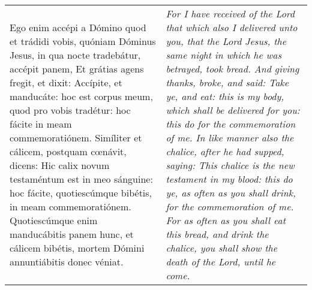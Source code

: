 \begin{tabular}{p{8cm} | p{8cm}}
Ego enim accépi a Dómino quod et trádidi vobis, quóniam Dóminus Jesus, in qua nocte tradebátur, accépit panem,
Et grátias agens fregit, et dixit: Accípite, et manducáte: hoc est corpus meum, quod pro vobis tradétur: hoc fácite in meam commemoratiónem.
Simíliter et cálicem, postquam c\oe návit, dicens: Hic calix novum testaméntum est in meo sánguine: hoc fácite, quotiescúmque bibétis, in meam commemoratiónem.
Quotiescúmque enim manducábitis panem hunc, et cálicem bibétis, mortem Dómini annuntiábitis donec véniat.
& \textit{For I have received of the Lord that which also I delivered unto you, that the Lord Jesus, the same night in which he was betrayed, took bread.
And giving thanks, broke, and said: Take ye, and eat: this is my body, which shall be delivered for you: this do for the commemoration of me.
In like manner also the chalice, after he had supped, saying: This chalice is the new testament in my blood: this do ye, as often as you shall drink, for the commemoration of me.
For as often as you shall eat this bread, and drink the chalice, you shall show the death of the Lord, until he come.}
\end{tabular}
